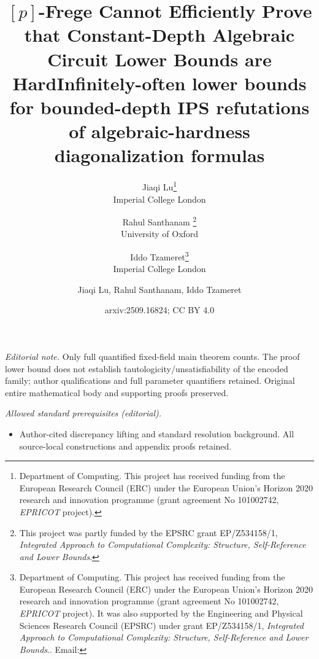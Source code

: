 \documentclass[11pt,letter]{article}
\title{\bf \ACZ$[p]$-Frege Cannot Efficiently Prove that Constant-Depth Algebraic Circuit Lower Bounds are Hard}
\author{
 Jiaqi Lu\thanks{Department of Computing. This project has received funding from the European Research Council (ERC) under the European Union’s Horizon 2020 research and innovation programme (grant agreement No 101002742, \textit{EPRICOT} project).}
 \smallskip
 \\
 \small Imperial College London
 \and 
 Rahul Santhanam%
 \thanks{This project was partly funded by the EPSRC grant EP/Z534158/1, \textit{Integrated Approach to Computational Complexity: Structure, Self-Reference and Lower Bounds}.}
 \smallskip
 \\
 \small University of Oxford
 \and
 Iddo Tzameret\thanks{Department of Computing. This project has received funding from the European Research Council (ERC) under the European Union’s Horizon 2020 research and innovation programme (grant agreement No 101002742, \mbox{\textit{EPRICOT}} project). It was also supported by the Engineering and Physical Sciences Research Council (EPSRC) under grant EP/Z534158/1, \textit{Integrated Approach to Computational Complexity: Structure, Self-Reference and Lower Bounds}.. Email: \text{iddo.tzameret@gmail.com}}
 \\ 
  \small Imperial College London
 }
\title{Infinitely-often lower bounds for bounded-depth IPS refutations of algebraic-hardness diagonalization formulas}
\author{Jiaqi Lu, Rahul Santhanam, Iddo Tzameret}
\date{arxiv:2509.16824; CC BY 4.0}
\theoremstyle{remark} %
\begin{document}
\maketitle
\noindent\textit{Editorial note.} Only full quantified fixed-field main theorem counts. The proof lower bound does not establish tautologicity/unsatisfiability of the encoded family; author qualifications and full parameter quantifiers retained. Original entire mathematical body and supporting proofs preserved.\par\medskip
\noindent\textit{Allowed standard prerequisites (editorial).}\begin{itemize}
\item Author-cited discrepancy lifting and standard resolution background. All source-local constructions and appendix proofs retained.
\end{itemize}\medskip

\maketitle

\thispagestyle{empty} 
  
\end{document}
